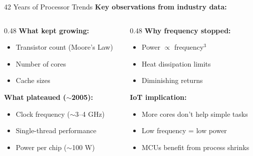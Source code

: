 \documentclass[aspectratio=169,11pt]{beamer}
\begin{document}
\begin{frame}{42 Years of Processor Trends}
    \textbf{Key observations from industry data:}
    
    \vspace{0.3cm}
    \begin{columns}[T]
        \begin{column}{0.48\textwidth}
            \textbf{What kept growing:}
            \begin{itemize}
                \item Transistor count (Moore's Law)
                \item Number of cores
                \item Cache sizes
            \end{itemize}
            
            \vspace{0.3cm}
            \textbf{What plateaued ($\sim$2005):}
            \begin{itemize}
                \item Clock frequency ($\sim$3--4 GHz)
                \item Single-thread performance
                \item Power per chip ($\sim$100 W)
            \end{itemize}
        \end{column}
        \begin{column}{0.48\textwidth}
            \textbf{Why frequency stopped:}
            \begin{itemize}
                \item Power $\propto$ frequency$^3$
                \item Heat dissipation limits
                \item Diminishing returns
            \end{itemize}
            
            \vspace{0.3cm}
            \textbf{IoT implication:}
            \begin{itemize}
                \item More cores don't help simple tasks
                \item Low frequency = low power
                \item MCUs benefit from process shrinks
            \end{itemize}
        \end{column}
    \end{columns}
\end{frame}
\end{document}
